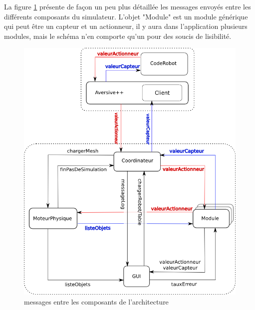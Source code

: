 


La figure \ref{messagearchitecture} présente de façon un peu plus détaillée les messages envoyés entre les différents composants du simulateur.
L'objet "Module" est un module générique qui peut être un capteur et un actionneur, il y aura dans l'application plusieurs modules, mais le schéma 
n'en comporte qu'un pour des soucis de lisibilité.


\begin{figure}
\includegraphics[scale=0.70]{architecturemsg.png}
\caption{messages entre les composants de l'architecture}
\label{messagearchitecture}
\end{figure}
\vspace{5 mm}
